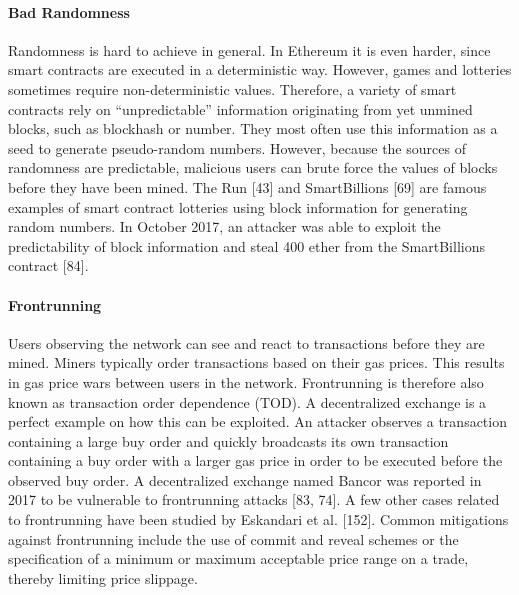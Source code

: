         \paragraph{Bad Randomness}
            Randomness is hard to achieve in general. In Ethereum it is even harder, since smart contracts are executed in a deterministic way. However, games and lotteries sometimes require non-deterministic values. Therefore, a variety of smart contracts rely on “unpredictable” information originating from yet unmined blocks, such as blockhash or number. They most often use this information as a seed to generate pseudo-random numbers. However, because the sources of randomness are predictable, malicious users can brute force the values of blocks before they have been mined.
            The Run [43] and SmartBillions [69] are famous examples of smart contract lotteries using block information for generating random numbers.
            In October 2017, an attacker was able to exploit the predictability of block information and steal 400 ether from the SmartBillions contract [84].

        \paragraph{Frontrunning}
            Users observing the network can see and react to transactions before they are mined. Miners typically order transactions based on their gas prices.
            This results in gas price wars between users in the network.
            Frontrunning is therefore also known as transaction order dependence (TOD).
            A decentralized exchange is a perfect example on how this can be exploited. An attacker observes a transaction containing a large buy order and quickly broadcasts its own transaction containing a buy order with a larger gas price in order to be executed before the observed buy order.
            A decentralized exchange named Bancor was reported in 2017 to be vulnerable to frontrunning attacks [83, 74].
            A few other cases related to frontrunning have been studied by Eskandari et al. [152].
            Common mitigations against frontrunning include the use of commit and reveal schemes or the specification of a minimum or maximum acceptable price range on a trade, thereby limiting price slippage.
        
